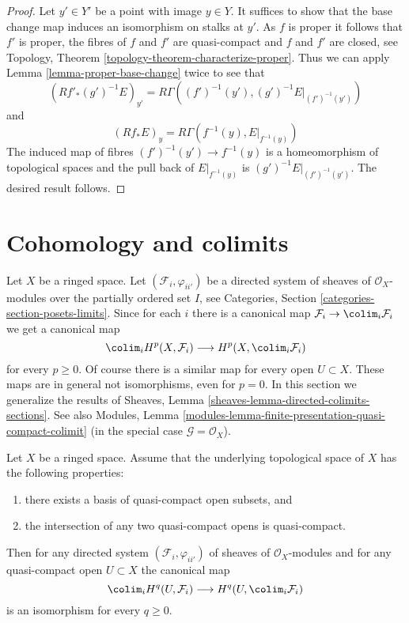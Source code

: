 \begin{proof}
Let $y' \in Y'$ be a point with image $y \in Y$. It suffices to show that
the base change map induces an isomorphism on stalks at $y'$.
As $f$ is proper it follows that $f'$ is proper, the fibres of $f$ and $f'$
are quasi-compact and $f$ and $f'$ are closed, see
Topology, Theorem \ref{topology-theorem-characterize-proper}.
Thus we can apply Lemma \ref{lemma-proper-base-change} twice to see that
$$
(Rf'_*(g')^{-1}E)_{y'} = R\Gamma((f')^{-1}(y'), (g')^{-1}E|_{(f')^{-1}(y')})
$$
and
$$
(Rf_*E)_y = R\Gamma(f^{-1}(y), E|_{f^{-1}(y)})
$$
The induced map of fibres $(f')^{-1}(y') \to f^{-1}(y)$ is
a homeomorphism of topological spaces and the pull back of
$E|_{f^{-1}(y)}$ is $(g')^{-1}E|_{(f')^{-1}(y')}$. The
desired result follows.
\end{proof}



\section{Cohomology and colimits}
\label{section-limits}

\noindent
Let $X$ be a ringed space. Let $(\mathcal{F}_i, \varphi_{ii'})$
be a directed system of sheaves of $\mathcal{O}_X$-modules
over the partially ordered set $I$, see
Categories, Section \ref{categories-section-posets-limits}.
Since for each $i$ there is a canonical map
$\mathcal{F}_i \to \colim_i \mathcal{F}_i$ we get a
canonical map
$$
\colim_i H^p(X, \mathcal{F}_i)
\longrightarrow
H^p(X, \colim_i \mathcal{F}_i)
$$
for every $p \geq 0$. Of course there is a similar map for
every open $U \subset X$. These maps are in general not isomorphisms,
even for $p = 0$. In this section we generalize the results of
Sheaves, Lemma \ref{sheaves-lemma-directed-colimits-sections}.
See also
Modules, Lemma \ref{modules-lemma-finite-presentation-quasi-compact-colimit}
(in the special case $\mathcal{G} = \mathcal{O}_X$).

\begin{lemma}
\label{lemma-quasi-separated-cohomology-colimit}
Let $X$ be a ringed space. Assume that the underlying topological space
of $X$ has the following properties:
\begin{enumerate}
\item there exists a basis of quasi-compact open subsets, and
\item the intersection of any two quasi-compact opens is quasi-compact.
\end{enumerate}
Then for any directed system $(\mathcal{F}_i, \varphi_{ii'})$
of sheaves of $\mathcal{O}_X$-modules and for any quasi-compact open
$U \subset X$ the canonical map
$$
\colim_i H^q(U, \mathcal{F}_i)
\longrightarrow
H^q(U, \colim_i \mathcal{F}_i)
$$
is an isomorphism for every $q \geq 0$.
\end{lemma}

